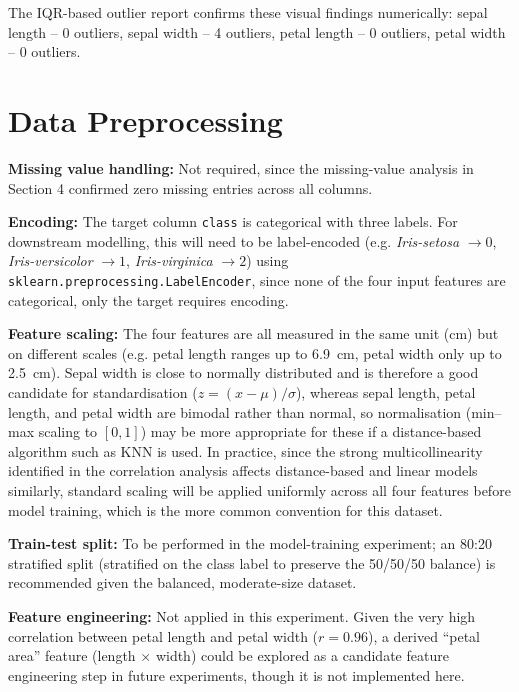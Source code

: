 \documentclass[12pt,a4paper]{article}
\begin{document}
The IQR-based outlier report confirms these visual findings numerically: sepal length -- 0 outliers, sepal width -- 4 outliers, petal length -- 0 outliers, petal width -- 0 outliers.

\section{Data Preprocessing}
\textbf{Missing value handling:} Not required, since the missing-value analysis in Section 4 confirmed zero missing entries across all columns.

\textbf{Encoding:} The target column \texttt{class} is categorical with three labels. For downstream modelling, this will need to be label-encoded (e.g. \textit{Iris-setosa} $\to 0$, \textit{Iris-versicolor} $\to 1$, \textit{Iris-virginica} $\to 2$) using \texttt{sklearn.preprocessing.LabelEncoder}, since none of the four input features are categorical, only the target requires encoding.

\textbf{Feature scaling:} The four features are all measured in the same unit (cm) but on different scales (e.g. petal length ranges up to 6.9~cm, petal width only up to 2.5~cm). Sepal width is close to normally distributed and is therefore a good candidate for standardisation ($z = (x-\mu)/\sigma$), whereas sepal length, petal length, and petal width are bimodal rather than normal, so normalisation (min--max scaling to $[0,1]$) may be more appropriate for these if a distance-based algorithm such as KNN is used. In practice, since the strong multicollinearity identified in the correlation analysis affects distance-based and linear models similarly, standard scaling will be applied uniformly across all four features before model training, which is the more common convention for this dataset.

\textbf{Train-test split:} To be performed in the model-training experiment; an 80:20 stratified split (stratified on the class label to preserve the 50/50/50 balance) is recommended given the balanced, moderate-size dataset.

\textbf{Feature engineering:} Not applied in this experiment. Given the very high correlation between petal length and petal width ($r=0.96$), a derived ``petal area'' feature (length $\times$ width) could be explored as a candidate feature engineering step in future experiments, though it is not implemented here.
\end{document}

